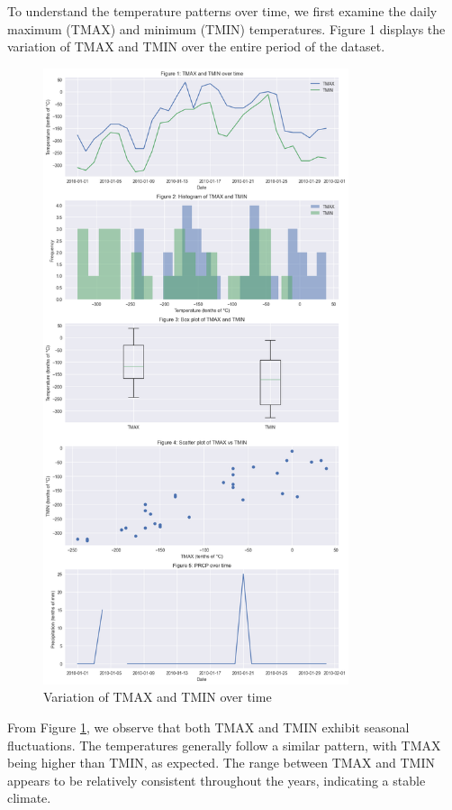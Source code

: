 \documentclass{article}
\begin{document}
To understand the temperature patterns over time, we first examine the daily maximum (TMAX) and minimum (TMIN) temperatures. Figure 1 displays the variation of TMAX and TMIN over the entire period of the dataset.

\begin{figure}[h]
  \centering
  \includegraphics[width=0.8\textwidth]{figure_0.png}
  \caption{Variation of TMAX and TMIN over time}
  \label{fig:temp_over_time}
\end{figure}

From Figure \ref{fig:temp_over_time}, we observe that both TMAX and TMIN exhibit seasonal fluctuations. The temperatures generally follow a similar pattern, with TMAX being higher than TMIN, as expected. The range between TMAX and TMIN appears to be relatively consistent throughout the years, indicating a stable climate.
\end{document}
